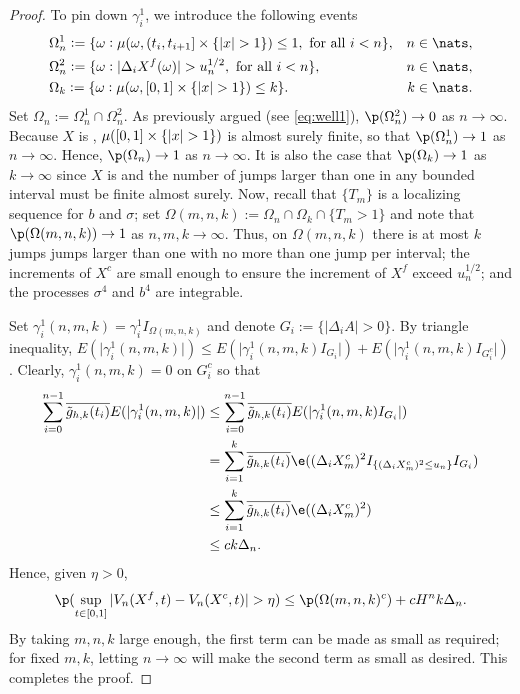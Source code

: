 \begin{proof}
To pin down $\gamma^1_i$, we introduce the following events
\begin{align}
&\Omega_n^1 := \{\omega : \mu(\omega,  (t_i, t_{i+1}] \times \{\vert x \vert > 1\} ) \le 1, \text{ for all } i <n  \}, & n \in \nats, \notag\\
&\Omega_n^2 := \{ \omega: \vert\Delta_i X^f(\omega)\vert > u_n^{1/2} , \text{ for all }i < n   \},& n \in \nats,\notag\\
&\Omega_k := \{\omega : \mu(\omega, \domain  \times \{\vert x \vert > 1\} ) \le k \}.  & k \in \nats.\notag
  \label{}
\end{align}
Set $\Omega_n := \Omega_n^1 \cap \Omega_n^2$.  As previously argued (see \eqref{eq:well1}), $\p(\Omega^2_n) \to 0$ as $n \to \infty$.  Because $X$ is \cadlag, $\mu(  [0,1] \times \{\vert x \vert > 1\} ) $ is almost surely finite, so that  $\p(\Omega^1_n) \to 1$ as $n \to \infty$.    Hence, $\p(\Omega_n) \to 1$ as $n \to \infty$. It is also the case that $\p(\Omega_k) \to 1$ as $k \to \infty$ since $X$ is \cadlag and the number of jumps larger than one in any bounded interval must be finite almost surely. Now, recall that $\{T_m \}$ is a localizing sequence for $b$ and $\sigma$;  set $\Omega(m,n,k) := \Omega_n \cap \Omega_k \cap \{T_m > 1\}$ and note that $\p(\Omega(m,n,k)) \to 1$ as $n,m, k \to \infty$.  Thus, on $\Omega(m,n,k)$ there is at most $k$ jumps jumps larger than  one with no more than one  jump per interval; the increments of $X^c$ are small enough to ensure the increment of $X^f$ exceed $u_n^{1/2}$; and the processes $\sigma^4$ and $b^4$ are integrable. 

Set $\gamma^1_i(n, m, k) = \gamma^1_i I_{\Omega(m,n,k)}$  and  denote  $G_i := \{\vert \Delta_i A\vert  > 0\}$. By triangle inequality,  $E(\vert \gamma_i^1(n, m, k) \vert) \le E(\vert \gamma_i^1(n, m, k)  I_{G_i}\vert)  + E(\vert \gamma_i^1(n,m, k) I_{G^c_i}\vert)$. Clearly, $\gamma^1_i(n,m, k) = 0$ on $G^c_i$  so that 
\begin{align}
\sum_{i =0}^{n-1} \btghki E(\vert \gamma_i^1(n,m, k) \vert) & \le\sum_{i =0}^{n-1} \btghki E(\vert \gamma_i^1(n,m, k) I_{G_i}\vert) \notag\\
 & =  \sum_{i =1}^{k} \btghki\e( (\dxc_m)^2 I_{\{(\dxc_m)^2 \le u_n\}}I_{G_i})\notag\\
 &\le \sum_{i =1}^{k} \btghki\e((\dxc_m)^2)\notag \\
 &\le c k \Delta_n\notag.
  \label{}
\end{align}
Hence, given $\eta > 0$, 
\begin{align}
  \p(\sup_{t \in \domain} \vert V_n(X^f,t)  - V_n(X^c, t) \vert > \eta) \le \p(\Omega(m,n,k)^c) + c H^n k \Delta_n.\notag
  \label{}
\end{align}
By taking $m,n,k$ large enough, the first term can be made as small as required; for fixed $m,k$, letting $n\to \infty$ will make the second term as small as desired. This completes the proof. 
\end{proof}
